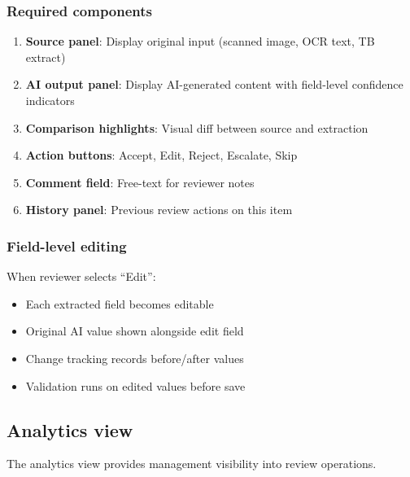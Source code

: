 \subsubsection{Required components}

\begin{enumerate}
  \item \textbf{Source panel}: Display original input (scanned image, OCR text,
        TB extract)
  \item \textbf{AI output panel}: Display AI-generated content with
        field-level confidence indicators
  \item \textbf{Comparison highlights}: Visual diff between source and extraction
  \item \textbf{Action buttons}: Accept, Edit, Reject, Escalate, Skip
  \item \textbf{Comment field}: Free-text for reviewer notes
  \item \textbf{History panel}: Previous review actions on this item
\end{enumerate}

\subsubsection{Field-level editing}

When reviewer selects ``Edit'':
\begin{itemize}
  \item Each extracted field becomes editable
  \item Original AI value shown alongside edit field
  \item Change tracking records before/after values
  \item Validation runs on edited values before save
\end{itemize}

\subsection{Analytics view}

The analytics view provides management visibility into review operations.

